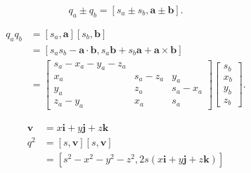 \begin{tcolorbox}[breakable, enhanced,title = {加减法}]
    $$
        q_{a} \pm q_{b}=\left[s_{a} \pm s_{b}, \mathbf{a} \pm \mathbf{b}\right] .
    $$
\end{tcolorbox}

\begin{tcolorbox}[breakable, enhanced,title = {乘积}]
    $$
        \begin{aligned}
            q_{a} q_{b} & =\left[s_{a}, \mathbf{a}\right]\left[s_{b}, \mathbf{b}\right]                                                         \\
                        & =\left[s_{a} s_{b}-\mathbf{a} \cdot \mathbf{b}, s_{a} \mathbf{b}+s_{b} \mathbf{a}+\mathbf{a} \times \mathbf{b}\right] \\
                        & =\left[\begin{array}{rrr}
                    s_{a}-x_{a}-y_{a}-z_{a}                 \\
                    x_{a}       & s_{a}-z_{a} & y_{a}       \\
                    y_{a}       & z_{a}       & s_{a}-x_{a} \\
                    z_{a}-y_{a} & x_{a}       & s_{a}
                \end{array}\right]\left[\begin{array}{c}
                    s_{b} \\
                    x_{b} \\
                    y_{b} \\
                    z_{b}
                \end{array}\right] .
        \end{aligned}
    $$
\end{tcolorbox}

\begin{tcolorbox}[breakable, enhanced,title = {平方}]
    $$
        \begin{aligned}
            \mathbf{v} & =x \mathbf{i}+y \mathbf{j}+z \mathbf{k}                                            \\
            q^{2}      & =[s, \mathbf{v}][s, \mathbf{v}]                                                    \\
                       & =\left[s^{2}-x^{2}-y^{2}-z^{2}, 2 s(x \mathbf{i}+y \mathbf{j}+z \mathbf{k})\right]
        \end{aligned}
    $$
\end{tcolorbox}

